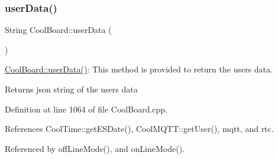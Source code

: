 \subsubsection{\texorpdfstring{user\+Data()}{userData()}}
{\footnotesize\ttfamily String Cool\+Board\+::user\+Data (\begin{DoxyParamCaption}{ }\end{DoxyParamCaption})}

\hyperlink{classCoolBoard_ae7358fb6e623cfc81b775f5f1734909b}{Cool\+Board\+::user\+Data()}\+: This method is provided to return the user\textquotesingle{}s data.

\begin{DoxyReturn}{Returns}
json string of the user\textquotesingle{}s data 
\end{DoxyReturn}


Definition at line 1064 of file Cool\+Board.\+cpp.



References Cool\+Time\+::get\+E\+S\+Date(), Cool\+M\+Q\+T\+T\+::get\+User(), mqtt, and rtc.



Referenced by off\+Line\+Mode(), and on\+Line\+Mode().


